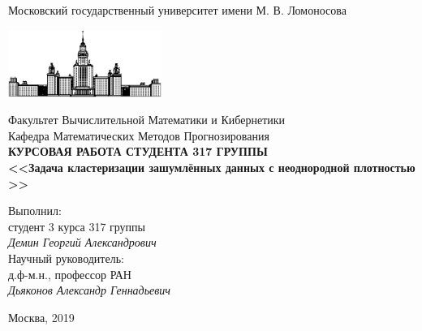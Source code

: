 \documentclass[12pt,fleqn]{article}
\begin{document}
\begin{titlepage}
\begin{center}
    Московский государственный университет имени М. В. Ломоносова

    \bigskip
    \includegraphics[width=50mm]{msu.eps}

    \bigskip
    Факультет Вычислительной Математики и Кибернетики\\
    Кафедра Математических Методов Прогнозирования\\[10mm]

    \textsf{\large\bfseries
        КУРСОВАЯ РАБОТА СТУДЕНТА 317 ГРУППЫ\\[10mm]
        <<Задача кластеризации зашумлённых данных с неоднородной плотностью >>
    }\\[10mm]

    \begin{flushright}
        \parbox{0.5\textwidth}{
            Выполнил:\\
            студент 3 курса 317 группы\\
            \emph{Демин Георгий Александрович}\\[5mm]
            Научный руководитель:\\
            д.ф-м.н., профессор РАН\\
            \emph{Дьяконов Александр Геннадьевич}
        }
    \end{flushright}

    \vspace{\fill}
    Москва, 2019
\end{center}
\end{titlepage}
\end{document}
